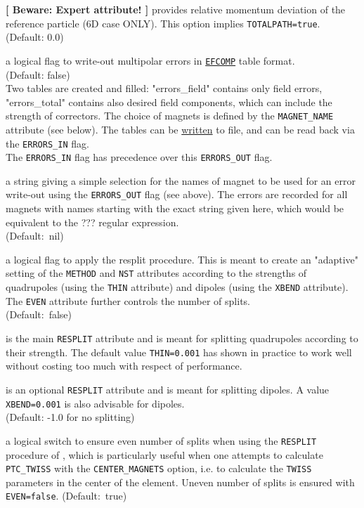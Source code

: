 \begin{madlist}
   \textbf{[ Beware: Expert attribute! ]}
  provides relative momentum deviation of the reference particle (6D case
  ONLY). This option implies \texttt{TOTALPATH=true}. \\
  (Default: 0.0)

   a logical flag to write-out multipolar errors
  in \hyperref[sec:efcomp]{\texttt{EFCOMP}} table format.
  \\ (Default: false) \\
  Two tables are created and filled: "errors\_field" contains only
  field errors, "errors\_total" contains also desired field
  components, which can include the strength of correctors.
  The choice of magnets is defined by the \texttt{MAGNET\_NAME}
  attribute (see below).
  The tables can be \hyperref[sec:write]{written} to file, and can be
  read back via the \texttt{ERRORS\_IN} flag.\\
  The \texttt{ERRORS\_IN} flag has precedence over this \texttt{ERRORS\_OUT} flag.

   a string giving a simple selection for the
  names of magnet to be used for an error write-out using the
  \texttt{ERRORS\_OUT} flag (see above). The errors are recorded for all
  magnets with names starting with the exact string given here, which
  would be equivalent to the ??? regular expression.\\
  (Default:~nil)

   a logical flag to apply the \ptc resplit
  procedure. This is meant to create an "adaptive" setting of the
  \texttt{METHOD} and \texttt{NST} attributes according to the strengths
  of quadrupoles (using the \texttt{THIN}  attribute) and dipoles (using
  the \texttt{XBEND} attribute). The \texttt{EVEN} attribute further
  controls the number of splits.  \\
  (Default:~false)

   is the main \texttt{RESPLIT} attribute and is meant for
  splitting quadrupoles according to their strength. The default value
  \texttt{THIN=0.001} has shown in practice to work well without costing
  too much with respect of performance.

   is an optional \texttt{RESPLIT} attribute and is meant for
  splitting dipoles. A value \texttt{XBEND=0.001} is also advisable for
  dipoles. \\
  (Default: -1.0 for no splitting)

   a logical switch to ensure even number of splits when
  using the \texttt{RESPLIT}  procedure of \ptc, which is particularly
  useful when one attempts to calculate \texttt{PTC\_TWISS} with the
  \texttt{CENTER\_MAGNETS} option, i.e. to calculate the \texttt{TWISS}
  parameters in the center of the element.
  Uneven number of splits is ensured with \texttt{EVEN=false}.
  (Default:~true)
\end{madlist}

